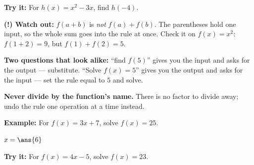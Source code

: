 \documentclass[12pt]{article}
\begin{document}
\begin{tryitbox}
\textbf{Try it:} \quad For $h(x) = x^2 - 3x$, find $h(-4)$.\\[2pt]
\end{tryitbox}

\begin{watchoutbox}
\textbf{(!) Watch out:} $f(a + b)$ is \emph{not} $f(a) + f(b)$. The parentheses hold one input, so the whole sum goes into the rule at once. Check it on $f(x) = x^2$: $f(1+2) = 9$, but $f(1) + f(2) = 5$.
\end{watchoutbox}


\begin{formulabox}
\textbf{Two questions that look alike:} ``find $f(5)$'' gives you the input and asks for the output --- substitute. ``Solve $f(x) = 5$'' gives you the output and asks for the input --- set the rule equal to $5$ and solve.\par
\textbf{Never divide by the function's name.} There is no factor to divide away; undo the rule one operation at a time instead.
\end{formulabox}

\begin{examplebox}
\textbf{Example:} \quad For $f(x) = 3x + 7$, solve $f(x) = 25$.

$x = \ans{6}$
\end{examplebox}

\begin{tryitbox}
\textbf{Try it:} \quad For $f(x) = 4x - 5$, solve $f(x) = 23$.\\[2pt]
\end{tryitbox}
\end{document}
